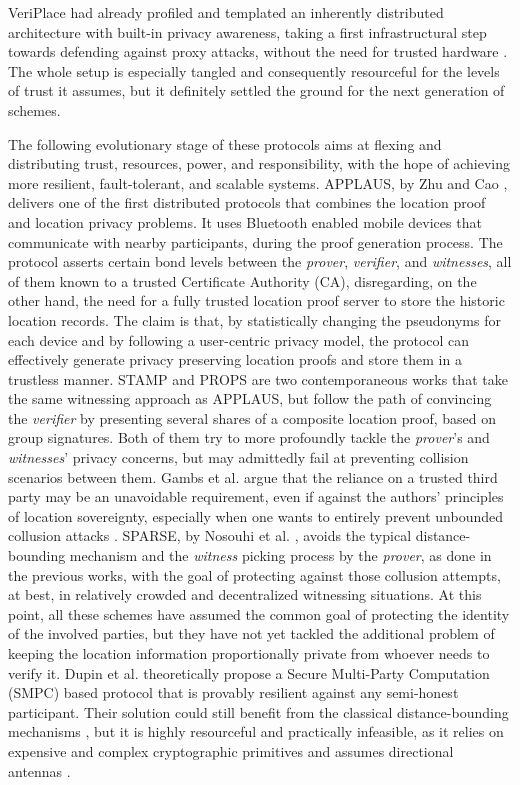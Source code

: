 VeriPlace had already profiled and templated an inherently distributed architecture with built-in privacy awareness, taking a first infrastructural step towards defending against proxy attacks, without the need for trusted hardware \cite{luo2010veriplace}. The whole setup is especially tangled and consequently resourceful for the levels of trust it assumes, but it definitely settled the ground for the next generation of \pol{} schemes. 

The following evolutionary stage of these protocols aims at flexing and distributing trust, resources, power, and responsibility, with the hope of achieving more resilient, fault-tolerant, and scalable systems. APPLAUS, by Zhu and Cao \cite{zhu2011applaus}, delivers one of the first distributed protocols that combines the location proof and location privacy problems. It uses Bluetooth enabled mobile devices that communicate with nearby participants, during the proof generation process. The protocol asserts certain bond levels between the \emph{prover}, \emph{verifier}, and \emph{witnesses}, all of them known to a trusted Certificate Authority (CA), disregarding, on the other hand, the need for a fully trusted location proof server to store the historic location records. The claim is that, by statistically changing the pseudonyms for each device and by following a user-centric privacy model, the protocol can effectively generate privacy preserving location proofs and store them in a trustless manner. STAMP \cite{wang2016stamp} and PROPS \cite{gambs2014props} are two contemporaneous works that take the same witnessing approach as APPLAUS, but follow the path of convincing the \emph{verifier} by presenting several shares of a composite location proof, based on group signatures. Both of them try to more profoundly tackle the \emph{prover}'s and \emph{witnesses}' privacy concerns, but may admittedly fail at preventing collision scenarios between them. Gambs et al. argue that the reliance on a trusted third party may be an unavoidable requirement, even if against the authors' principles of location sovereignty, especially when one wants to entirely prevent unbounded collusion attacks \cite{gambs2014props}. SPARSE, by Nosouhi et al. \cite{nosouhi2018sparse}, avoids the typical distance-bounding mechanism and the \emph{witness} picking process by the \emph{prover}, as done in the previous works, with the goal of protecting against those collusion attempts, at best, in relatively crowded and decentralized witnessing situations. At this point, all these schemes have assumed the common goal of protecting the identity of the involved parties, but they have not yet tackled the additional problem of keeping the location information proportionally private from whoever needs to verify it. Dupin et al. \cite{dupin2018location} theoretically propose a Secure Multi-Party Computation (SMPC) based protocol that is provably resilient against any semi-honest participant. Their solution could still benefit from the classical distance-bounding mechanisms \cite{dupin2018location}, but it is highly resourceful and practically infeasible, as it relies on expensive and complex cryptographic primitives and assumes directional antennas \cite{yang2021group}.

